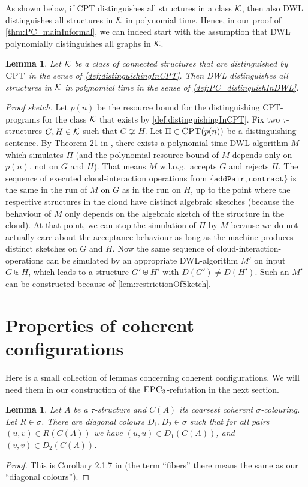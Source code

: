 \documentclass[10pt,a4paper]{article}
\newtheorem{lemma}[theorem]{Lemma}
\newcommand{\CPT}{\mbox{\sc CPT}}
\newcommand{\EPC}{\mbox{\sc EPC}}
\newcommand{\Kk}{{\cal K}}
\newcommand{\pairOp }{\texttt{addPair}}
\newcommand{\sccOp }{\texttt{contract}}
\begin{document}
	As shown below, if CPT distinguishes all structures in a class $\Kk$, then also DWL distinguishes all structures in $\Kk$ in polynomial time. Hence, in our proof of \autoref{thm:PC_mainInformal}, we can indeed start with the assumption that DWL polynomially distinguishes all graphs in $\Kk$.
	\begin{lemma}
		\label{lem:connectionDWLdistinguishabilityCPT}
		Let $\Kk$ be a class of connected structures that are distinguished by $\CPT$ in the sense of \autoref{def:distinguishingInCPT}.
		Then DWL distinguishes all structures in $\Kk$ in polynomial time in the sense of \autoref{def:PC_distinguishInDWL}.
	\end{lemma}
	\textit{Proof sketch.} 	Let $p(n)$ be the resource bound for the distinguishing CPT-programs for the class $\Kk$ that exists by \autoref{def:distinguishingInCPT}.
	Fix two $\tau$-structures $G, H \in \Kk$ such that $G \not\cong H$. Let $\Pi \in \CPT(p(n))$ be a distinguishing sentence. By Theorem 21 in \cite{dwl}, there exists a polynomial time DWL-algorithm $M$ which simulates $\Pi$ (and the polynomial resource bound of $M$ depends only on $p(n)$, not on $G$ and $H$). That means $M$ w.l.o.g.\ accepts $G$ and rejects $H$. The sequence of executed cloud-interaction operations from $\{ \pairOp, \sccOp  \}$ is the same in the run of $M$ on $G$ as in the run on $H$, up to the point where the respective structures in the cloud have distinct algebraic sketches (because the behaviour of $M$ only depends on the algebraic sketch of the structure in the cloud). At that point, we can stop the simulation of $\Pi$ by $M$ because we do not actually care about the acceptance behaviour as long as the machine produces distinct sketches on $G$ and $H$. Now the same sequence of cloud-interaction-operations can be simulated by an appropriate DWL-algorithm $M'$ on input $G\uplus H$, which leads to a structure $G' \uplus H'$ with $D(G') \neq D(H')$. Such an $M'$ can be constructed because of \autoref{lem:restrictionOfSketch}.  \qedsymbol
	
	
	
	
	\section{Properties of coherent configurations}
	\label{sec:coherentConfigurations}
	Here is a small collection of lemmas concerning coherent configurations. We will need them in our construction of the $\EPC_3$-refutation in the next section.
	\begin{lemma}
		\label{lem:PC_endpointsColour}
		Let $A$ be a $\tau$-structure and $C(A)$ its coarsest coherent $\sigma$-colouring. Let $R \in \sigma$. There are diagonal colours $D_1, D_2 \in \sigma$ such that for all pairs $(u,v) \in R(C(A))$ we have $(u,u) \in D_1(C(A))$, and $(v,v) \in D_2(C(A))$. 
	\end{lemma}
	\begin{proof}
		This is Corollary 2.1.7 in \cite{chen2019lectures} (the term ``fibers'' there means the same as our ``diagonal colours'').
	\end{proof}
	
\end{document}
